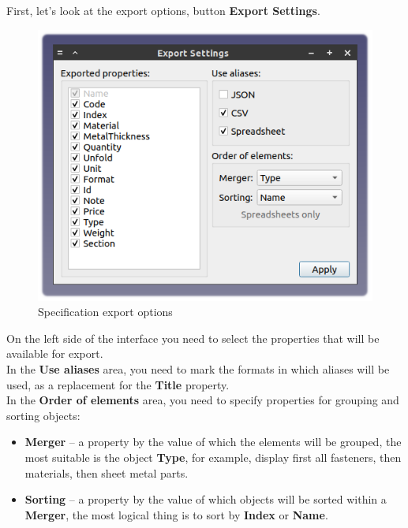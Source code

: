 \documentclass[a4paper,12pt]{article}
\begin{document}
\begin{flushleft}First, let's look at the export options, button \textbf{Export Settings}.\end{flushleft}

\begin{figure}[htp]
	\centering
	\includegraphics[scale=1]{img/specification_export.png}
	\caption{Specification export options}
	\label{sec:specification_export}
\end{figure}

On the left side of the interface you need to select the properties that will be available for export.\\

In the \textbf{Use aliases} area, you need to mark the formats in which aliases will be used, as a replacement for the \textbf{Title} property.\\

In the \textbf{Order of elements} area, you need to specify properties for grouping and sorting objects:
\begin{itemize}
	\item \textbf{Merger} -- a property by the value of which the elements will be grouped, the most suitable is the object \textbf{Type}, for example, display first all fasteners, then materials, then sheet metal parts.
	\item \textbf{Sorting} -- a property by the value of which objects will be sorted within a \textbf{Merger}, the most logical thing is to sort by \textbf{Index} or \textbf{Name}.
\end{itemize}
\end{document}
